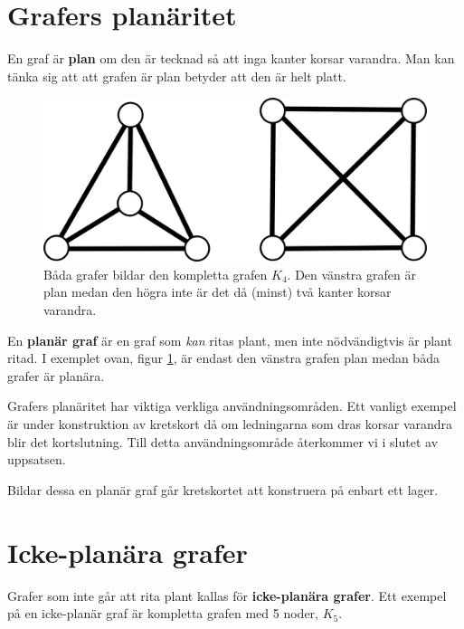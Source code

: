 \documentclass[a4paper,11pt]{article}
\begin{document}
\section*{Grafers planäritet}

En graf är \textbf{plan} om den är tecknad så att inga kanter korsar varandra. Man kan tänka sig att att grafen är plan betyder att den är helt platt.

\begin{figure}[!ht]
	\begin{center}
		\includegraphics{fig4}
		\caption{Båda grafer bildar den kompletta grafen $K_4$. Den vänstra grafen är plan medan den högra inte är det då (minst) två kanter korsar varandra.}
		\label{fig4}
	\end{center}
\end{figure}
\FloatBarrier

En \textbf{planär graf} är en graf som \emph{kan} ritas plant, men inte nödvändigtvis är plant ritad. I exemplet ovan, figur \ref{fig4}, är endast den vänstra grafen plan medan båda grafer är planära.

Grafers planäritet har viktiga verkliga användningsområden. Ett vanligt exempel är under konstruktion av kretskort då om ledningarna som dras korsar varandra blir det kortslutning. Till detta användningsområde återkommer vi i slutet av uppsatsen.

Bildar dessa en planär graf går kretskortet att konstruera på enbart ett lager.

\section*{Icke-planära grafer}

Grafer som inte går att rita plant kallas för \textbf{icke-planära grafer}. Ett exempel på en icke-planär graf är kompletta grafen med 5 noder, $K_5$.
\end{document}
